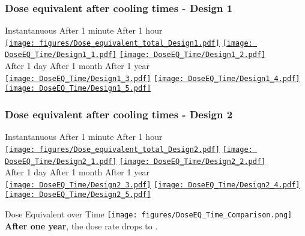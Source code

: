 \documentclass[xcolor={dvipsnames}]{beamer}
\begin{document}
\begin{frame}
  \frametitle{Dose equivalent after cooling times - Design 1}
  \hypertarget{coolingtimesprev_Design1}{}
  \centering
    \hspace*{1.2cm} Instantanuous \hfill After 1 minute \hfill After 1 hour \hspace*{1.5cm} \\
  \hyperlink{Dose_equivalent_Design1}{\texttt{[image: figures/Dose\_equivalent\_total\_Design1.pdf]}}
  \hyperlink{Dose_equivalent_minute_Design1}{\texttt{[image: DoseEQ\_Time/Design1\_1.pdf]}}
  \hyperlink{Dose_equivalent_hour_Design1}{\texttt{[image: DoseEQ\_Time/Design1\_2.pdf]}}\\
    \hspace*{1.2cm} After 1 day \hfill After 1 month \hfill After 1 year\hspace*{1.5cm} \\
  \hyperlink{Dose_equivalent_day_Design1}{\texttt{[image: DoseEQ\_Time/Design1\_3.pdf]}}
  \hyperlink{Dose_equivalent_month_Design1}{\texttt{[image: DoseEQ\_Time/Design1\_4.pdf]}}
  \hyperlink{Dose_equivalent_year_Design1}{\texttt{[image: DoseEQ\_Time/Design1\_5.pdf]}}
\end{frame}
\begin{frame}
  \frametitle{Dose equivalent after cooling times - Design 2}
  \hypertarget{coolingtimesprev_Design2}{}
  \centering
    \hspace*{1.2cm} Instantanuous \hfill After 1 minute \hfill After 1 hour \hspace*{1.5cm} \\
  \hyperlink{Dose_equivalent_Design2}{\texttt{[image: figures/Dose\_equivalent\_total\_Design2.pdf]}}
  \hyperlink{Dose_equivalent_minute_Design2}{\texttt{[image: DoseEQ\_Time/Design2\_1.pdf]}}
  \hyperlink{Dose_equivalent_hour_Design2}{\texttt{[image: DoseEQ\_Time/Design2\_2.pdf]}}\\
    \hspace*{1.2cm} After 1 day \hfill After 1 month \hfill After 1 year\hspace*{1.5cm} \\
  \hyperlink{Dose_equivalent_day_Design2}{\texttt{[image: DoseEQ\_Time/Design2\_3.pdf]}}
  \hyperlink{Dose_equivalent_month_Design2}{\texttt{[image: DoseEQ\_Time/Design2\_4.pdf]}}
  \hyperlink{Dose_equivalent_year_Design2}{\texttt{[image: DoseEQ\_Time/Design2\_5.pdf]}}
\end{frame}
\begin{frame}{Dose Equivalent over Time}
\centering
  \texttt{[image: figures/DoseEQ\_Time\_Comparison.png]}\\
\textbf{After one year}, the dose rate drops to \textbf{}.
\end{frame}
\end{document}
